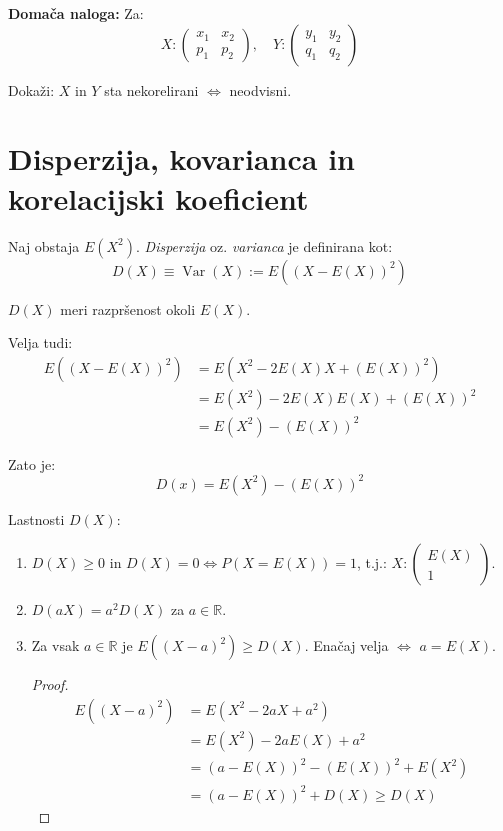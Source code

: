 \documentclass[12pt]{book}
\def\n{\noindent}
\theoremstyle{definition}
\theoremstyle{plain}
\theoremstyle{plain}
\theoremstyle{plain}
\theoremstyle{remark}
\begin{document}
\n \textbf{Domača naloga:} Za:
$$
X:\left(\begin{array}{cc}
    x_1 & x_2 \\
    p_1 & p_2
    \end{array}\right), \quad Y:\left(\begin{array}{cc}
    y_1 & y_2 \\
    q_1 & q_2
    \end{array}\right)
$$

Dokaži: $X$ in $Y$ sta nekorelirani $\iff$ neodvisni.

\chapter[Disperzija, kovarianca in korelacijski koeficient]{Disperzija, kovarianca in\\korelacijski koeficient}

Naj obstaja $E\left(X^2\right)$. \emph{Disperzija} oz. \emph{varianca} je definirana kot:
$$
D(X) \equiv \operatorname{Var}(X):=E\left((X-E(X))^2\right)
$$

$D(X)$ meri razpršenost okoli $E(X)$. 

\n Velja tudi: 
$$
\begin{aligned}
    E\left((X-E(X))^2\right)&=E\left(X^2-2 E(X) X+(E(X))^2\right) \\
    &=E\left(X^2\right)-2 E(X) E(X)+(E(X))^2 \\
    &=E\left(X^2\right)-(E(X))^2
\end{aligned}
$$

Zato je: 
$$
D(x)=E\left(X^2\right)-\left(E(X)\right)^2
$$

\n Lastnosti $D(X)$:

\begin{enumerate}
    \item $D(X) \geq 0 \text{ in } D(X) = 0 \iff P(X=E(X))=1$, t.j.: $X:\left(\begin{array}{c}E(X) \\ 1 \end{array}\right)$.
    \item $D(aX) = a^2 D(X)$ za $a \in \mathbb{R}$.
    \item Za vsak $a \in \mathbb{R}$ je $E\left((X-a)^2\right) \geq D(X)$. Enačaj velja $\iff$ $a=E(X)$.
    \begin{proof}
        $$
        \begin{aligned}
            E\left((X-a)^2\right)&=E\left(X^2-2 a X+a^2\right) \\
            &=E\left(X^2\right)-2 a  E(X)+a^2 \\
            &=(a-E(X))^2 - (E(X))^2+E\left(X^2\right) \\
            &=(a-E(X))^2+D(X) \geq D(X)
        \end{aligned}
        $$
    \end{proof}
\end{enumerate}
\end{document}
